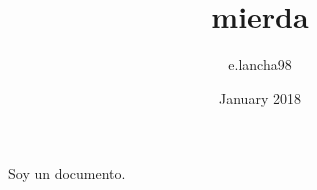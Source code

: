 \documentclass{article}
\title{mierda}
\author{e.lancha98 }
\date{January 2018}
\begin{document}
\maketitle

Soy un documento.
\end{document}
